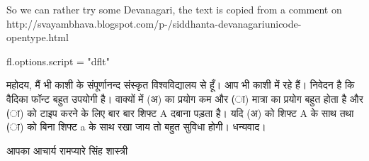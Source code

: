 \documentclass{article}
\begin{document}
\siddhanta
So we can rather try some Devanagari, the text is copied from a comment on http://svayambhava.\-blogspot.com\-/p\--/\-sidd\-hanta-\-deva\-na\-ga\-ri\-unicode-\-open\-type.html

\begin{luacode*}
fl.options.script = "dflt"
\end{luacode*}

महोदय,
मैं भी काशी के संपूर्णानन्द संस्कृत विश्वविद्यालय से हूँ। आप भी काशी में रहे हैं।
निवेदन है कि वैदिका फॉन्ट बहुत उपयोगी है। वाक्यों में (अ) का प्रयोग कम और (ा) मात्रा का प्रयोग बहुत होता है और (ा) को टाइप करने के लिए बार बार शिफ्ट A दबाना पड़ता है। यदि (अ) को शिफ्ट A के साथ तथा (ा) को बिना शिफ्ट a के साथ रखा जाय तो बहुत सुविधा होगी।
धन्यवाद।

आपका
आचार्य रामप्यारे सिंह शास्त्री
\end{document}
